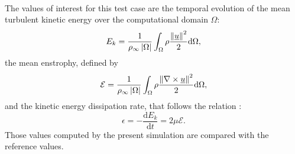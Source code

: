       \paragraph{}
      The values of interest for this test case are the temporal evolution of the mean turbulent kinetic energy over the computational domain $\Omega$:
      \begin{equation}
        E_k = \frac{1}{\rho_\infty \left|\Omega\right|} \int_\Omega \rho \frac{\norm{\vec{u}}^2}{2} \mathrm{d}\Omega ,
      \end{equation}
      the mean enstrophy, defined by
      \begin{equation}
        \mathcal{E} = \frac{1}{\rho_\infty \left|\Omega\right|} \int_\Omega \rho \frac{\norm{\nabla \times \vec{u}}^2}{2} \mathrm{d}\Omega ,
      \end{equation}
      and the kinetic energy dissipation rate, that follows the relation :
      \begin{equation}
        \epsilon = -\frac{\mathrm{d} E_k}{\mathrm{d} t} = 2 \mu \mathcal{E} .
      \end{equation}
      Those values computed by the present simulation are compared with the reference values.

